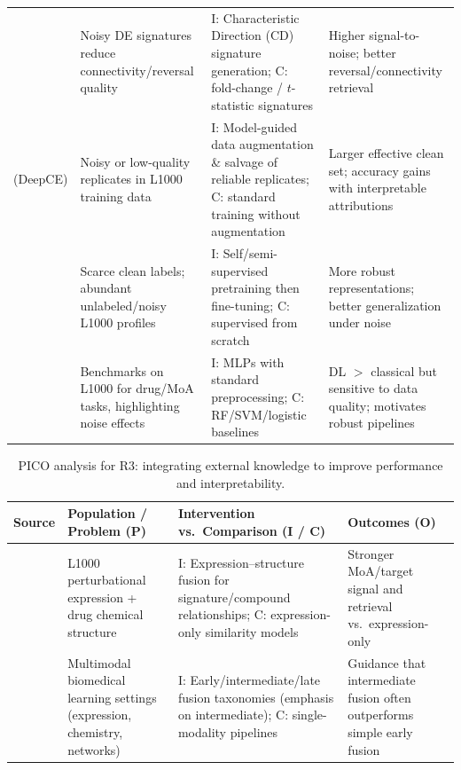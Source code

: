 \documentclass[twocolumn]{article}
\begin{document}
{\begin{table}[t]
\begin{tabular}{p{3.1cm} p{4.8cm} p{5.8cm} p{3.3cm}}
    \cite{duan2016l1000cds2} &
    Noisy DE signatures reduce connectivity/reversal quality &
    I\@: Characteristic Direction (CD) signature generation; 
    C\@: fold-change / $t$-statistic signatures &
    Higher signal-to-noise; better reversal/connectivity retrieval \\[0.35em]

    \cite{pham2021deep} (DeepCE) &
    Noisy or low-quality replicates in L1000 training data &
    I\@: Model-guided data augmentation \& salvage of reliable replicates; 
    C\@: standard training without augmentation &
    Larger effective clean set; accuracy gains with interpretable attributions \\[0.35em]

    \cite{bang2024transfer} &
    Scarce clean labels; abundant unlabeled/noisy L1000 profiles &
    I\@: Self/semi-supervised pretraining then fine-tuning; 
    C\@: supervised from scratch &
    More robust representations; better generalization under noise \\[0.35em]

    \cite{mcdermott2019deep} &
    Benchmarks on L1000 for drug/MoA tasks, highlighting noise effects &
    I\@: MLPs with standard preprocessing; 
    C\@: RF/SVM/logistic baselines &
    DL $>$ classical but sensitive to data quality; motivates robust pipelines \\
    \bottomrule
  \end{tabular}
\end{table}

\begin{table}[t]
  \centering
  \caption{PICO analysis for R3: integrating external knowledge to improve performance and interpretability.}
  \begin{tabular}{p{3.1cm} p{4.8cm} p{5.8cm} p{3.3cm}}
    \toprule
    \textbf{Source} & \textbf{Population / Problem (P)} & \textbf{Intervention vs.\ Comparison (I / C)} & \textbf{Outcomes (O)} \\
    \midrule

    \cite{liu2015compound} &
    L1000 perturbational expression + drug chemical structure &
    I\@: Expression–structure fusion for signature/compound relationships; 
    C\@: expression-only similarity models &
    Stronger MoA/target signal and retrieval vs.\ expression-only \\[0.35em]

    \cite{stahlschmidt2022multimodal} &
    Multimodal biomedical learning settings (expression, chemistry, networks) &
    I\@: Early/intermediate/late fusion taxonomies (emphasis on intermediate); 
    C\@: single-modality pipelines &
    Guidance that intermediate fusion often outperforms simple early fusion \\[0.35em]


\end{tabular}
\end{table}}
\end{document}
